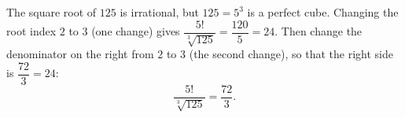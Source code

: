 The square root of $125$ is irrational, but $125=5^3$ is a perfect cube. Changing the root index $2$ to $3$ (one change) gives $\dfrac{5!}{\sqrt[3]{125}}=\dfrac{120}{5}=24$. Then change the denominator on the right from $2$ to $3$ (the second change), so that the right side is $\dfrac{72}{3}=24$:
\[\boxed{\dfrac{5!}{\sqrt[3]{125}}=\dfrac{72}{3}}.\]
